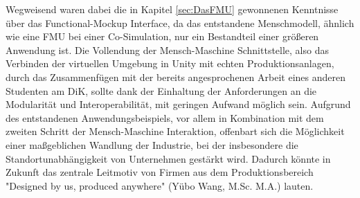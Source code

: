 \newline
Wegweisend waren dabei die in Kapitel \ref{sec:DasFMU} gewonnenen Kenntnisse über das Functional-Mockup Interface, da das entstandene Menschmodell, ähnlich wie eine FMU bei einer Co-Simulation, nur ein Bestandteil einer größeren Anwendung ist. Die Vollendung der Mensch-Maschine Schnittstelle, also das Verbinden der virtuellen Umgebung in Unity mit echten Produktionsanlagen, durch das Zusammenfügen mit der bereits angesprochenen Arbeit eines anderen Studenten am DiK, sollte dank der Einhaltung der Anforderungen an die Modularität und Interoperabilität, mit geringen Aufwand möglich sein.
\newline\newline
Aufgrund des entstandenen Anwendungsbeispiels, vor allem in Kombination mit dem zweiten Schritt der Mensch-Maschine Interaktion, offenbart sich die Möglichkeit einer maßgeblichen Wandlung der Industrie, bei der insbesondere die Standortunabhängigkeit von Unternehmen gestärkt wird. Dadurch könnte in Zukunft das zentrale Leitmotiv von Firmen aus dem Produktionsbereich "Designed by us, produced anywhere" (Yübo Wang, M.Sc. M.A.) lauten.
